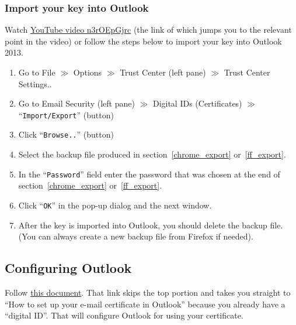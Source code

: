 \documentclass[pdftex,12pt,titlepage=false]{scrartcl}
\begin{document}
\subsubsection{Import your key into Outlook}\label{import}
Watch
\href{https://www.youtube.com/watch?v=n3rOEpGjrc\&start=390}{YouTube
  video n3rOEpGjrc} (the link of which jumps you to the relevant
point in the video)
or follow the steps below to import your key into Outlook 2013.
\begin{enumerate}
\item Go to File $\gg$ Options $\gg$ Trust Center (left pane) $\gg$ Trust Center Settings..
\item Go to Email Security (left pane) $\gg$ Digital IDs (Certificates) $\gg$ ``\texttt{Import/Export}'' (button)
\item Click ``\texttt{Browse..}'' (button)
\item Select the backup file produced in section~\ref{chrome_export} or~\ref{ff_export}.
\item In the ``\texttt{Password}'' field enter the password that was chosen at the end of section~\ref{chrome_export} or~\ref{ff_export}.
\item Click ``\texttt{OK}'' in the pop-up dialog and the next window.
\item After the key is imported into Outlook, you should delete the
  backup file.  (You can always create a new backup file from Firefox
  if needed).
\end{enumerate}

\subsection{Configuring Outlook}\label{outlookcfg}
Follow
\href{https://www.ablebits.com/office-addins-blog/2014/04/11/email-encryption-outlook/#setup-email-certificate}{this
  document}.  That link skips the top portion and takes you straight
to ``How to set up your e-mail certificate in Outlook'' because you
already have a ``digital ID''.  That will configure Outlook for using
your certificate.
\end{document}
